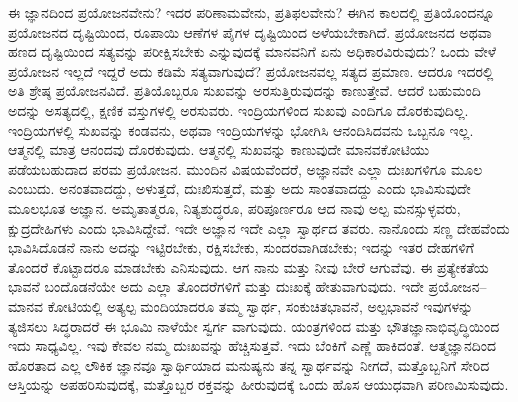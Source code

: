 ಈ ಜ್ಞಾನದಿಂದ ಪ್ರಯೋಜನವೇನು? ಇದರ ಪರಿಣಾಮವೇನು, ಪ್ರತಿಫಲವೇನು? ಈಗಿನ ಕಾಲದಲ್ಲಿ ಪ್ರತಿಯೊಂದನ್ನೂ ಪ್ರಯೋಜನದ ದೃಷ್ಟಿಯಿಂದ, ರೂಪಾಯಿ ಆಣೆಗಳ ಪೈಗಳ ದೃಷ್ಟಿಯಿಂದ ಅಳೆಯಬೇಕಾಗಿದೆ. ಪ್ರಯೋಜನದ ಅಥವಾ ಹಣದ ದೃಷ್ಟಿಯಿಂದ ಸತ್ಯವನ್ನು ಪರೀಕ್ಷಿಸಬೇಕು ಎನ್ನುವುದಕ್ಕೆ ಮಾನವನಿಗೆ ಏನು ಅಧಿಕಾರವಿರುವುದು? ಒಂದು ವೇಳೆ ಪ್ರಯೋಜನ ಇಲ್ಲದೆ ಇದ್ದರೆ ಅದು ಕಡಿಮೆ ಸತ್ಯವಾಗುವುದೆ? ಪ್ರಯೋಜನವಲ್ಲ ಸತ್ಯದ ಪ್ರಮಾಣ. ಆದರೂ ಇದರಲ್ಲಿ ಅತಿ ಶ್ರೇಷ್ಠ ಪ್ರಯೋಜನವಿದೆ. ಪ್ರತಿಯೊಬ್ಬರೂ ಸುಖವನ್ನು ಅರಸುತ್ತಿರುವುದನ್ನು ಕಾಣುತ್ತೇವೆ. ಆದರೆ ಬಹುಮಂದಿ ಅದನ್ನು ಅಸತ್ಯದಲ್ಲಿ, ಕ್ಷಣಿಕ ವಸ್ತುಗಳಲ್ಲಿ ಅರಸುವರು. ಇಂದ್ರಿಯಗಳಿಂದ ಸುಖವು ಎಂದಿಗೂ ದೊರಕುವುದಿಲ್ಲ. ಇಂದ್ರಿಯಗಳಲ್ಲಿ ಸುಖವನ್ನು ಕಂಡವನು, ಅಥವಾ ಇಂದ್ರಿಯಗಳನ್ನು ಭೋಗಿಸಿ ಆನಂದಿಸಿದವನು ಒಬ್ಬನೂ ಇಲ್ಲ. ಆತ್ಮನಲ್ಲಿ ಮಾತ್ರ ಆನಂದವು ದೊರಕುವುದು. ಆತ್ಮನಲ್ಲಿ ಸುಖವನ್ನು ಕಾಣುವುದೇ ಮಾನವಕೋಟಿಯು ಪಡೆಯಬಹುದಾದ ಪರಮ ಪ್ರಯೋಜನ. ಮುಂದಿನ ವಿಷಯವೆಂದರೆ, ಅಜ್ಞಾನವೇ ಎಲ್ಲಾ ದುಃಖಗಳಿಗೂ ಮೂಲ ಎಂಬುದು. ಅನಂತವಾದದ್ದು, ಅಳುತ್ತದೆ, ದುಃಖಿಸುತ್ತದೆ, ಮತ್ತು ಅದು ಸಾಂತವಾದದ್ದು ಎಂದು ಭಾವಿಸುವುದೇ ಮೂಲಭೂತ ಅಜ್ಞಾನ. ಅಮೃತಾತ್ಮರೂ, ನಿತ್ಯಶುದ್ಧರೂ, ಪರಿಪೂರ್ಣರೂ ಆದ ನಾವು ಅಲ್ಪ ಮನಸ್ಸುಳ್ಳವರು, ಕ್ಷುದ್ರದೇಹಿಗಳು ಎಂದು ಭಾವಿಸಿದ್ದೇವೆ. ಇದೇ ಅಜ್ಞಾನ ಇದೇ ಎಲ್ಲಾ ಸ್ವಾರ್ಥದ ತವರು. ನಾನೊಂದು ಸಣ್ಣ ದೇಹವೆಂದು ಭಾವಿಸಿದೊಡನೆ ನಾನು ಅದನ್ನು ಇಟ್ಟಿರಬೇಕು, ರಕ್ಷಿಸಬೇಕು, ಸುಂದರವಾಗಿಡಬೇಕು; ಇದನ್ನು ಇತರ ದೇಹಗಳಿಗೆ ತೊಂದರೆ ಕೊಟ್ಟಾದರೂ ಮಾಡಬೇಕು ಎನಿಸುವುದು. ಆಗ ನಾನು ಮತ್ತು ನೀವು ಬೇರೆ ಆಗುವೆವು. ಈ ಪ್ರತ್ಯೇಕತೆಯ ಭಾವನೆ ಬಂದೊಡನೆಯೇ ಅದು ಎಲ್ಲಾ ತೊಂದರೆಗಳಿಗೆ ಮತ್ತು ದುಃಖಕ್ಕೆ ಹೇತುವಾಗುವುದು. ಇದೇ ಪ್ರಯೋಜನ– ಮಾನವ ಕೋಟಿಯಲ್ಲಿ ಅತ್ಯಲ್ಪ ಮಂದಿಯಾದರೂ ತಮ್ಮ ಸ್ವಾರ್ಥ, ಸಂಕುಚಿತಭಾವನೆ, ಅಲ್ಪಭಾವನೆ ಇವುಗಳನ್ನು ತ್ಯಜಿಸಲು ಸಿದ್ಧರಾದರೆ ಈ ಭೂಮಿ ನಾಳೆಯೇ ಸ್ವರ್ಗ ವಾಗುವುದು. ಯಂತ್ರಗಳಿಂದ ಮತ್ತು ಭೌತಜ್ಞಾನಾಭಿವೃದ್ಧಿಯಿಂದ ಇದು ಸಾಧ್ಯವಿಲ್ಲ. ಇವು ಕೇವಲ ನಮ್ಮ ದುಃಖವನ್ನು ಹೆಚ್ಚಿಸುತ್ತವೆ. ಇದು ಬೆಂಕಿಗೆ ಎಣ್ಣೆ ಹಾಕಿದಂತೆ. ಆತ್ಮಜ್ಞಾನದಿಂದ ಹೊರತಾದ ಎಲ್ಲ ಲೌಕಿಕ ಜ್ಞಾನವೂ ಸ್ವಾರ್ಥಿಯಾದ ಮನುಷ್ಯನು ತನ್ನ ಸ್ವಾರ್ಥವನ್ನು ನೀಗದೆ, ಮತ್ತೊಬ್ಬನಿಗೆ ಸೇರಿದ ಆಸ್ತಿಯನ್ನು ಅಪಹರಿಸುವುದಕ್ಕೆ, ಮತ್ತೊಬ್ಬರ ರಕ್ತವನ್ನು ಹೀರುವುದಕ್ಕೆ ಒಂದು ಹೊಸ ಆಯುಧವಾಗಿ ಪರಿಣಮಿಸುವುದು.


